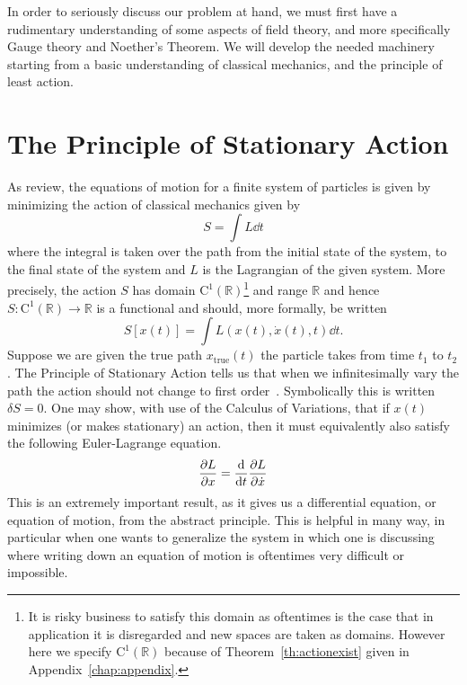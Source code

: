 
In order to seriously discuss our problem at hand, we must first have a
rudimentary understanding of some aspects of field theory, and more specifically
Gauge theory and Noether's Theorem. We will develop the needed machinery
starting from a basic understanding of classical mechanics, and the principle of
least action.

\section{The Principle of Stationary Action}\label{sec:stationary}
As review, the equations of motion for a finite system of particles is given by
minimizing the action of classical mechanics given by
\begin{equation}\label{eq:action}
    S = \int L\dd{t}
\end{equation}
where the integral is taken over the path from the initial state of the system,
to the final state of the system and \(L\) is the Lagrangian of the given
system. More precisely, the action \(S\) has domain
\(\mathrm{C}^1(\mathbb{R})\)\footnote{It is risky business to satisfy this
domain as oftentimes is the case that in application it is disregarded and new
spaces are taken as domains. However here we specify
\(\mathrm{C}^1(\mathbb{R})\) because of Theorem~\ref{th:actionexist} given in
Appendix~\ref{chap:appendix}.} and range \(\mathbb{R}\) and hence
\(S:\mathrm{C}^1(\mathbb{R})\to \mathbb{R}\) is a functional and should, more
formally, be written
\begin{equation}\label{eq:actionFunc}
    S\left[x(t)\right] = \int L(x(t), \dot{x}(t), t)\dd{t}.
\end{equation}
Suppose we are given the true path \(x_\mathrm{true}(t)\) the particle takes
from time \(t_1\) to \(t_2\). The Principle of Stationary Action tells us that
when we infinitesimally vary the path the action should not change to first
order~\cite{feynman}. Symbolically this is written \(\delta S = 0\). One may
show, with use of the Calculus of Variations, that if \(x(t)\) minimizes (or
makes stationary) an action, then it must equivalently also satisfy the
following Euler-Lagrange equation.
\begin{equation}\label{eq:eulerlag}
    \pdv{L}{x} = \dv{t} \pdv{L}{\dot{x}}
\end{equation}
This is an extremely important result, as it gives us a differential equation,
or equation of motion, from the abstract principle. This is helpful in many way,
in particular when one wants to generalize the system in which one is discussing
where writing down an equation of motion is oftentimes very difficult or
impossible.


